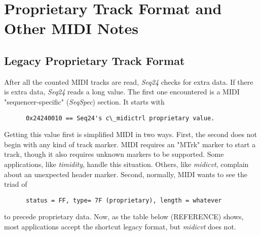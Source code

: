 %
%
%

\section{Proprietary Track Format and Other MIDI Notes}
\label{sec:proprietary_track_and_midi_notes}

\subsection{Legacy Proprietary Track Format}
\label{subsec:legacy_proprietary_track_format}

   After all the counted MIDI tracks are read, \textsl{Seq24} checks for
   extra data.  If there is extra data, \textsl{Seq24} reads a long value.
   The first one encountered is a MIDI "sequencer-specific"
   (\textsl{SeqSpec}) section.  It starts with

   \begin{verbatim}
      0x24240010 == Seq24's c\_midictrl proprietary value.
   \end{verbatim}

   Getting this value first is simplified MIDI in two ways.
   First, the second does not begin with any kind of track marker.  MIDI
   requires an "MTrk" marker to start a track, though it also requires
   unknown markers to be supported.  Some applications, like
   \textsl{timidity}, handle this situation.  Others, like \textsl{midicvt},
   complain about an unexpected header marker.
   Second, normally, MIDI wants to see the triad of

   \begin{verbatim}
      status = FF, type= 7F (proprietary), length = whatever
   \end{verbatim}

   to precede proprietary data.
   Now, as the table below (REFERENCE) shows, most applications accept
   the shortcut legacy format, but \textsl{midicvt} does not.

